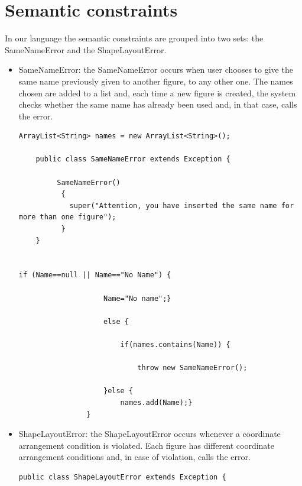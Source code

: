 \documentclass[a4paper]{article}
\begin{document}
\section{Semantic constraints}
In our language the semantic constraints are grouped into two sets: the SameNameError and the ShapeLayoutError.
\vspace{1\baselineskip}
\begin{itemize}
\item SameNameError: the SameNameError occurs when user chooses to give the same name previously given to another figure, to any other one. The names chosen are added to a list and, each time a new figure is created, the system checks whether the same name has already been used and, in that case, calls the error.
\begin{verbatim}
ArrayList<String> names = new ArrayList<String>();
	
	public class SameNameError extends Exception {

		 SameNameError()
		  {
		    super("Attention, you have inserted the same name for more than one figure");
		  }
	}
	

if (Name==null || Name=="No Name") {

					Name="No name";}
					
					else {
							
	   					if(names.contains(Name)) {			
					
							throw new SameNameError();

					}else {
						names.add(Name);}
				}

\end{verbatim}
\item ShapeLayoutError: the ShapeLayoutError occurs whenever a coordinate arrangement condition is violated. Each figure has different coordinate arrangement conditions and, in case of violation, calls the error.
\begin{verbatim}
public class ShapeLayoutError extends Exception {


\end{verbatim}
\end{itemize}
\end{document}
